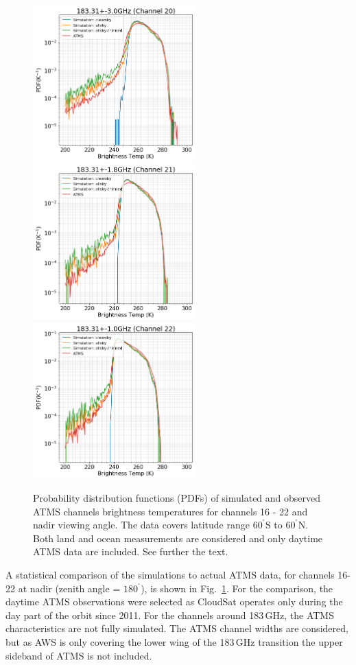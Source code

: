 \documentclass[12pt]{article}
\newcommand{\degree}{\ensuremath{\mathrm{^\circ}}}
\begin{document}
\begin{figure}[p]
	\includegraphics[height=60mm]{ATMS_C20_distribution}\hspace{5mm}%
	\includegraphics[height=60mm]{ATMS_C21_distribution}
	\includegraphics[height=60mm]{ATMS_C22_distribution}
	\caption{Probability distribution functions (PDFs) of simulated and
      observed ATMS channels brightness temperatures for channels 16 - 22 and
      nadir viewing angle. The data covers latitude range $60^{\degree}$S to
      $60^{\degree}$N. Both land and ocean measurements are considered and only
      daytime ATMS data are included. See further the text.}
	\label{fig:pdf:c16-22}
\end{figure}


A statistical comparison of the simulations to actual ATMS data, for channels
16-22 at nadir (zenith angle = $180^{\degree}$), is shown in
Fig.~\ref{fig:pdf:c16-22}. For the comparison, the daytime ATMS observations
were selected as CloudSat operates only during the day part of the orbit since
2011. For the channels around 183\,GHz, the ATMS characteristics are not fully
simulated. The ATMS channel widths are considered, but as AWS is only covering
the lower wing of the 183\,GHz transition the upper sideband of ATMS is not
included.
\end{document}
